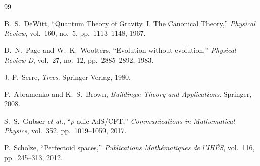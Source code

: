 \documentclass[12pt,a4paper]{article}
\begin{document}
\begin{thebibliography}{99}

B.~S.~DeWitt, ``Quantum Theory of Gravity. I. The Canonical Theory,''
\emph{Physical Review}, vol.~160, no.~5, pp.~1113--1148, 1967.

D.~N.~Page and W.~K.~Wootters, ``Evolution without evolution,''
\emph{Physical Review D}, vol.~27, no.~12, pp.~2885--2892, 1983.

J.-P.~Serre, \emph{Trees}. Springer-Verlag, 1980.

P.~Abramenko and K.~S.~Brown, \emph{Buildings: Theory and Applications}. Springer, 2008.

S.~S.~Gubser \emph{et al.}, ``$p$-adic AdS/CFT,''
\emph{Communications in Mathematical Physics}, vol.~352, pp.~1019--1059, 2017.

P.~Scholze, ``Perfectoid spaces,''
\emph{Publications Math\'ematiques de l'IH\'ES}, vol.~116, pp.~245--313, 2012.

\end{thebibliography}
\end{document}
